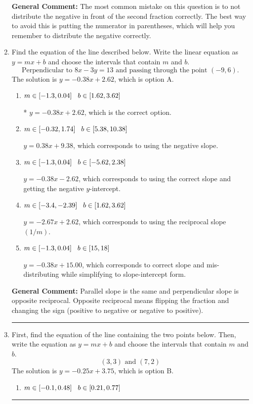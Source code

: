 \documentclass{extbook}[14pt]
\newcommand{\litem}[1]{\item #1

\rule{\textwidth}{0.4pt}}
\begin{document}
\begin{enumerate}
{\textbf{General Comment:} The most common mistake on this question is to not distribute the negative in front of the second fraction correctly. The best way to avoid this is putting the numerator in parentheses, which will help you remember to distribute the negative correctly.
}
\litem{
Find the equation of the line described below. Write the linear equation as $ y=mx+b $ and choose the intervals that contain $m$ and $b$.
\[ \text{Perpendicular to } 8 x - 3 y = 13 \text{ and passing through the point } (-9, 6). \]The solution is \( y = -0.38x + 2.62 \), which is option A.\begin{enumerate}[label=\Alph*.]
\item \( m \in [-1.3, 0.04] \hspace*{3mm} b \in [1.62, 3.62] \)

* $y = -0.38x + 2.62$, which is the correct option.
\item \( m \in [-0.32, 1.74] \hspace*{3mm} b \in [5.38, 10.38] \)

 $y = 0.38x + 9.38$, which corresponds to using the negative slope.
\item \( m \in [-1.3, 0.04] \hspace*{3mm} b \in [-5.62, 2.38] \)

 $y = -0.38x - 2.62$, which corresponds to using the correct slope and getting the negative $y$-intercept.
\item \( m \in [-3.4, -2.39] \hspace*{3mm} b \in [1.62, 3.62] \)

 $y = -2.67x + 2.62$, which corresponds to using the reciprocal slope $(1/m)$.
\item \( m \in [-1.3, 0.04] \hspace*{3mm} b \in [15, 18] \)

 $y = -0.38x + 15.00$, which corresponds to correct slope and mis-distributing while simplifying to slope-intercept form.
\end{enumerate}

\textbf{General Comment:} Parallel slope is the same and perpendicular slope is opposite reciprocal. Opposite reciprocal means flipping the fraction and changing the sign (positive to negative or negative to positive).
}
\litem{
First, find the equation of the line containing the two points below. Then, write the equation as $ y=mx+b $ and choose the intervals that contain $m$ and $b$.
\[ (3, 3) \text{ and } (7, 2) \]The solution is \( y = -0.25x + 3.75 \), which is option B.\begin{enumerate}[label=\Alph*.]
\item \( m \in [-0.1, 0.48] \hspace*{3mm} b \in [0.21, 0.77] \)


\end{enumerate}}
\end{enumerate}
\end{document}
